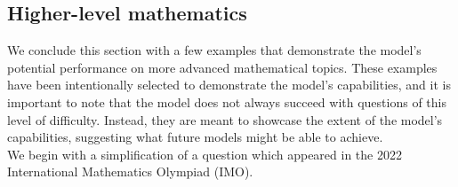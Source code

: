 \subsection{Higher-level mathematics}

We conclude this section with a few examples that demonstrate the model's potential performance on more advanced mathematical topics. These examples have been intentionally selected to demonstrate the model's capabilities, and it is important to note that the model does not always succeed with questions of this level of difficulty. Instead, they are meant to showcase the extent of the model's capabilities, suggesting what future models might be able to achieve. \\

We begin with a simplification of a question which appeared in the 2022 International Mathematics Olympiad (IMO).

